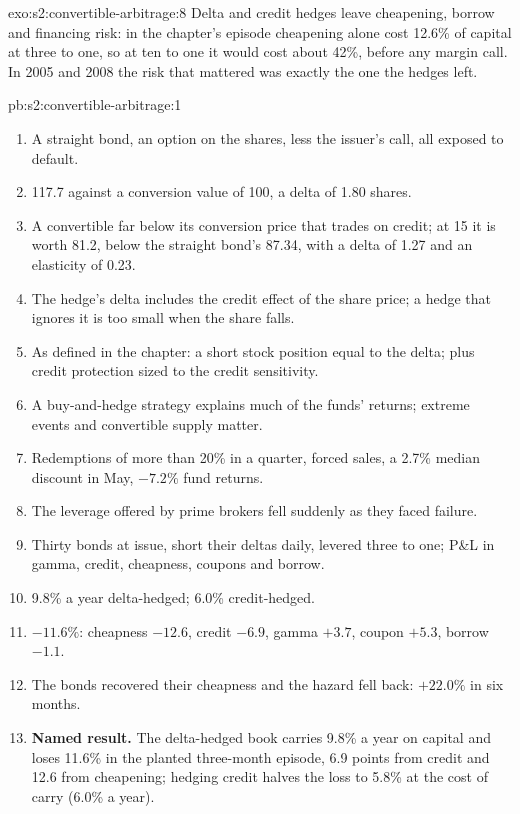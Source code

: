 \begin{solution}{exo:s2:convertible-arbitrage:8}
Delta and credit hedges leave cheapening, borrow and financing risk: in the chapter's episode cheapening alone cost 12.6\% of capital at three to one,
so at ten to one it would cost about 42\%, before any margin call. In 2005 and 2008 the risk that mattered was exactly the one the hedges left.
\end{solution}

\begin{solution}{pb:s2:convertible-arbitrage:1}
\begin{enumerate}
\item A straight bond, an option on the shares, less the issuer's call, all exposed to default.
\item 117.7 against a conversion value of 100, a delta of 1.80 shares.
\item A convertible far below its conversion price that trades on credit; at 15 it is worth 81.2, below the straight bond's 87.34, with a delta of 1.27
and an elasticity of 0.23.
\item The hedge's delta includes the credit effect of the share price; a hedge that ignores it is too small when the share falls.
\item As defined in the chapter: a short stock position equal to the delta; plus credit protection sized to the credit sensitivity.
\item A buy-and-hedge strategy explains much of the funds' returns; extreme events and convertible supply matter.
\item Redemptions of more than 20\% in a quarter, forced sales, a 2.7\% median discount in May, $-7.2\%$ fund returns.
\item The leverage offered by prime brokers fell suddenly as they faced failure.
\item Thirty bonds at issue, short their deltas daily, levered three to one; P\&L in gamma, credit, cheapness, coupons and borrow.
\item 9.8\% a year delta-hedged; 6.0\% credit-hedged.
\item $-11.6\%$: cheapness $-12.6$, credit $-6.9$, gamma $+3.7$, coupon $+5.3$, borrow $-1.1$.
\item The bonds recovered their cheapness and the hazard fell back: $+22.0\%$ in six months.
\item \textbf{Named result.} The delta-hedged book carries 9.8\% a year on capital and loses 11.6\% in the planted three-month episode, 6.9 points from
credit and 12.6 from cheapening; hedging credit halves the loss to 5.8\% at the cost of carry (6.0\% a year).

\end{enumerate}
\end{solution}

